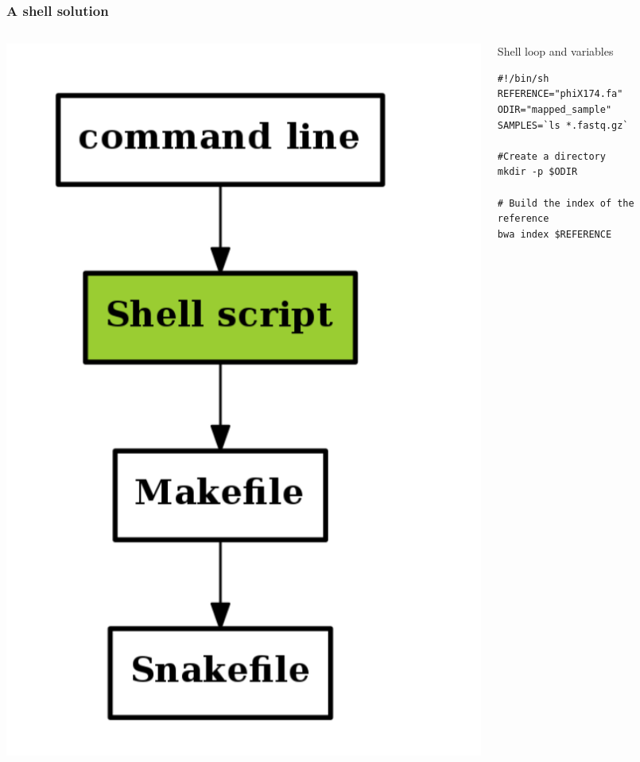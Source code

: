 \documentclass{beamer}
\begin{document}
 \begin{frame}[fragile]
  \frametitle{A shell solution}  
 
 \begin{columns}
 \begin{column}[T]{3cm}
 \includegraphics[width=1\textwidth, height=0.6\textheight]{images/flow_methods_2.png}
 \end{column}
  \begin{column}[T]{9cm}
 \begin{block}{Shell loop and variables}
  \begin{lstlisting}
#!/bin/sh
REFERENCE="phiX174.fa"
ODIR="mapped_sample"
SAMPLES=`ls *.fastq.gz` 

#Create a directory
mkdir -p $ODIR

# Build the index of the reference
bwa index $REFERENCE


\end{lstlisting}
\end{block}
\end{column}
\end{columns}
\end{frame}
\end{document}
